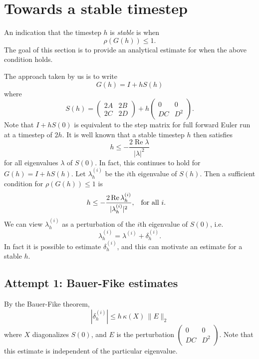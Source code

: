 \documentclass[10pt]{article}
\renewcommand{\Re}{\mathop{\textrm{Re}}}
\begin{document}
\section*{Towards a stable timestep}

An indication that the timestep $h$ is \emph{stable} is when
%
\[ \rho(G(h)) \leq 1. \]
%
The goal of this section is to provide an analytical estimate for when
the above condition holds.

The approach taken by us is to write
%
\[ G(h) = I + hS(h) \]
%
where
%
\[ S(h) = \begin{pmatrix} 2A & 2B \\ 2C & 2D \end{pmatrix} +
          h \begin{pmatrix} 0 & 0 \\ DC & D^2 \end{pmatrix}. \]
%
Note that $I + hS(0)$ is equivalent to the step matrix for full forward
Euler run at a timestep of $2h$. It is well known that a stable timestep
$h$ then satisfies
%
\[ h \leq - \frac{2 \Re \lambda}{|\lambda|^2} \]
%
for all eigenvalues $\lambda$ of $S(0)$. In fact, this continues to hold
for $G(h) = I +hS(h)$.  Let $\lambda_h^{(i)}$ be the $i$th eigenvalue of
$S(h)$. Then a sufficient condition for $\rho(G(h)) \leq 1$ is
%
\begin{align*}
h \leq -\frac{2 \Re \lambda_h^{(i)}}{|\lambda_h^{(i)}|^2},
& \textrm{\quad for all } i.
\end{align*}
%
We can view $\lambda_h^{(i)}$ as a perturbation of the $i$th eigenvalue
of $S(0)$, i.e.
%
\[ \lambda_h^{(i)} = \lambda^{(i)} + \delta_h^{(i)}. \]
%
In fact it is possible to estimate $\delta_h^{(i)}$, and this can
motivate an estimate for a stable $h$.

\subsection*{Attempt 1: Bauer-Fike estimates}

By the Bauer-Fike theorem,
%
\[ | \delta_h^{(i)} | \leq h \, \kappa(X) \, \|E\|_2 \]
%
where $X$ diagonalizes $S(0)$, and $E$ is the perturbation
$\begin{pmatrix} 0 & 0 \\ DC & D^2 \end{pmatrix}$. Note that this
estimate is independent of the particular eigenvalue.
\end{document}
